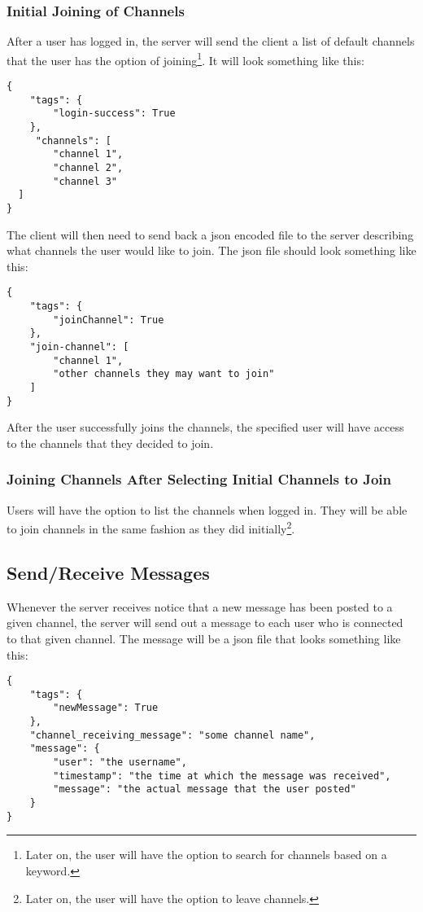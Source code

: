 \subsubsection{Initial Joining of Channels}
After a user has logged in, the server will send the client a list of default channels that the user has the option of joining\footnote{Later on, the user will have the option to search for channels based on a keyword.}. It will look something like this:

\begin{lstlisting}[style=json]
{
    "tags": {
        "login-success": True
    },
     "channels": [
        "channel 1",
        "channel 2",
        "channel 3"
  ]
}
\end{lstlisting}

The client will then need to send back a \gls{json} encoded file to the server describing what channels the user would like to join. The \gls{json} file should look something like this:

\begin{lstlisting}[style=json]
{
    "tags": {
        "joinChannel": True
    },
    "join-channel": [
        "channel 1",
        "other channels they may want to join"
    ]
}
\end{lstlisting}

After the user successfully joins the channels, the specified user will have
access to the channels that they decided to join.

\subsubsection{Joining Channels After Selecting Initial Channels to Join}
Users will have the option to list the channels when logged in. They will be able to join channels in the same fashion as they did initially\footnote{Later on, the user will have the option to leave channels.}.

\subsection{Send/Receive Messages}
Whenever the server receives notice that a new message has been posted to a given channel, the server will send out a message to each user who is connected to that given channel. The message will be a \gls{json} file that looks something like this:

\begin{lstlisting}[style=json]
{
    "tags": {
        "newMessage": True
    },
    "channel_receiving_message": "some channel name",
    "message": {
        "user": "the username",
        "timestamp": "the time at which the message was received",
        "message": "the actual message that the user posted"
    }
}
\end{lstlisting}

